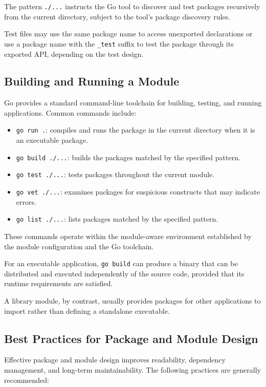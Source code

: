 The pattern \texttt{./...} instructs the Go tool to discover and test packages recursively from the current directory, subject to the tool's package discovery rules.

Test files may use the same package name to access unexported declarations or use a package name with the \texttt{\_test} suffix to test the package through its exported API, depending on the test design.

\subsection{Building and Running a Module}

Go provides a standard command-line toolchain for building, testing, and running applications. Common commands include:

\begin{itemize}
    \item \texttt{go run .}: compiles and runs the package in the current directory when it is an executable package.
    \item \texttt{go build ./...}: builds the packages matched by the specified pattern.
    \item \texttt{go test ./...}: tests packages throughout the current module.
    \item \texttt{go vet ./...}: examines packages for suspicious constructs that may indicate errors.
    \item \texttt{go list ./...}: lists packages matched by the specified pattern.
\end{itemize}

These commands operate within the module-aware environment established by the module configuration and the Go toolchain.

For an executable application, \texttt{go build} can produce a binary that can be distributed and executed independently of the source code, provided that its runtime requirements are satisfied.

A library module, by contrast, usually provides packages for other applications to import rather than defining a standalone executable.

\subsection{Best Practices for Package and Module Design}

Effective package and module design improves readability, dependency management, and long-term maintainability. The following practices are generally recommended:

